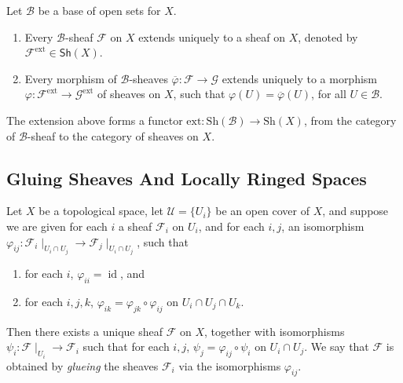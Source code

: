 \documentclass[11pt]{article}
\newcommand{\id}{\operatorname{id}}
\begin{document}
\begin{proposition}
    \label{prop: extension of base sheaf}
  \cite[Proposition I-12]{EisenbudHarris} 
  Let $\mathcal{B}$ be a base of open sets for $X$. 
  \begin{enumerate}[label=(\arabic*)]
    \item Every $\mathcal{B}$-sheaf $ \mathscr{F} $ on $X$ extends uniquely to a sheaf on $X$, 
     denoted by $ \mathscr{F}^{\operatorname{ext}} \in \mathsf{Sh}(X)$. 

    \item Every morphism of $\mathcal{B}$-sheaves 
    $\overline{\varphi}:\mathscr{F} \to \mathscr{G}$ extends uniquely to a morphism 
    $\varphi:\mathscr{F}^{\operatorname{ext}} \to \mathscr{G}^{\operatorname{ext}}$ of sheaves on $ X $, 
    such that $\varphi(U)=\overline{\varphi}(U)$, for all $U \in \mathcal{B}$. 
  \end{enumerate}
  The extension above forms a functor $\mathrm{ext}:\mathrm{Sh}(\mathcal{B}) \to \mathrm{Sh}(X)$, 
  from the category of $\mathcal{B}$-sheaf to the category of sheaves on $X$. 
\end{proposition}

\subsection{Gluing Sheaves And Locally Ringed Spaces}

\begin{proposition}
  \cite[Exercise II.1.22]{hartsAG} 
  Let $ X $ be a topological space, let $ \mathcal{U} = \{U_{i}\} $ be 
  an open cover of $ X $, and suppose we are given for each $ i $ a sheaf $ \mathscr{F}_{i} $ 
  on $ U_{i} $, and for each $ i,j $, an isomorphism 
  $ \varphi_{ij}: \mathscr{F}_{i} \mid_{U_{i} \cap U_{j}} \to \mathscr{F}_{j}\mid_{U_{i} \cap U_{j}}$, 
  such that 
  \begin{enumerate}[label=(\arabic*)]
    \item for each $ i $, $ \varphi_{ii} = \id $, and
    \item for each $ i,j,k $, $ \varphi_{ik} = \varphi_{jk} \circ \varphi_{ij} $ on $U_{i} \cap U_{j} \cap U_{k} $.  
  \end{enumerate}
  Then there exists a unique sheaf $ \mathscr{F} $ on $ X $, together with 
  isomorphisms $ \psi_{i} :\mathscr{F}\mid_{U_{i}} \to \mathscr{F}_{i} $ such that for 
  each $ i,j $, $ \psi_{j} = \varphi_{ij} \circ \psi_{i} $ on $ U_{i} \cap U_{j}$. 
  We say that $ \mathscr{F} $ is obtained by \emph{glueing} the sheaves $ \mathscr{F}_{i} $ 
  via the isomorphisms $ \varphi_{ij} $. 
\end{proposition}
\end{document}
